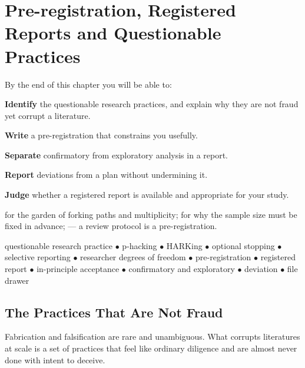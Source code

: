 \chapter{Pre-registration, Registered Reports and Questionable Practices}\label{ch:prereg}

\begin{outcomes}
By the end of this chapter you will be able to:
\begin{tight}
  \item \textbf{Identify} the questionable research practices, and explain why
    they are not fraud yet corrupt a literature.
  \item \textbf{Write} a pre-registration that constrains you usefully.
  \item \textbf{Separate} confirmatory from exploratory analysis in a report.
  \item \textbf{Report} deviations from a plan without undermining it.
  \item \textbf{Judge} whether a registered report is available and appropriate
    for your study.
\end{tight}
\end{outcomes}

\begin{prereq}
 for the garden of forking paths and multiplicity;
 for why the sample size must be fixed in advance;
 --- a review protocol is a pre-registration.
\end{prereq}

\begin{keyterms}
questionable research practice $\bullet$ p-hacking $\bullet$ HARKing $\bullet$
optional stopping $\bullet$ selective reporting $\bullet$ researcher degrees of
freedom $\bullet$ pre-registration $\bullet$ registered report $\bullet$
in-principle acceptance $\bullet$ confirmatory and exploratory $\bullet$
deviation $\bullet$ file drawer
\end{keyterms}

\section{The Practices That Are Not Fraud}

Fabrication and falsification are rare and unambiguous. What corrupts
literatures at scale is a set of practices that feel like ordinary diligence
and are almost never done with intent to deceive.

